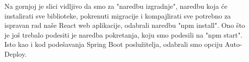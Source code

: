 		Na gornjoj je slici vidljivo da smo za "naredbu izgradnje", naredbu koja će instalirati sve biblioteke, pokrenuti migracije i kompajlirati sve potrebno za ispravan rad naše React web aplikacije, odabrali naredbu "npm install".
		Ono što je još trebalo podesiti je naredba pokretanja, koju smo podesili na "npm start".
		Isto kao i kod podešavanja Spring Boot poslužitelja, odabrali smo opciju Auto-Deploy.
	
		
	
	
	
		
		
		
		
		
		
		
		
		 
		
		
	    
	    
		
		
		
		
		
		
		
			
			\eject 